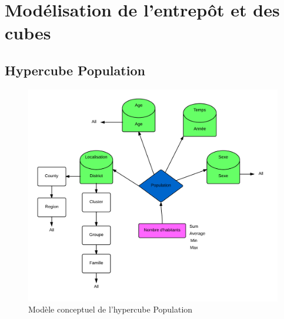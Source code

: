 \pagebreak


\chapter{Modélisation de l'entrepôt et des cubes}

\section{Hypercube Population}
\begin{figure}[h]
    \centering
    \includegraphics[width=\linewidth]{images/pop/cube.png}
    \caption{Modèle conceptuel de l'hypercube Population}
    \label{conception_cube_pop}
\end{figure}

\pagebreak

